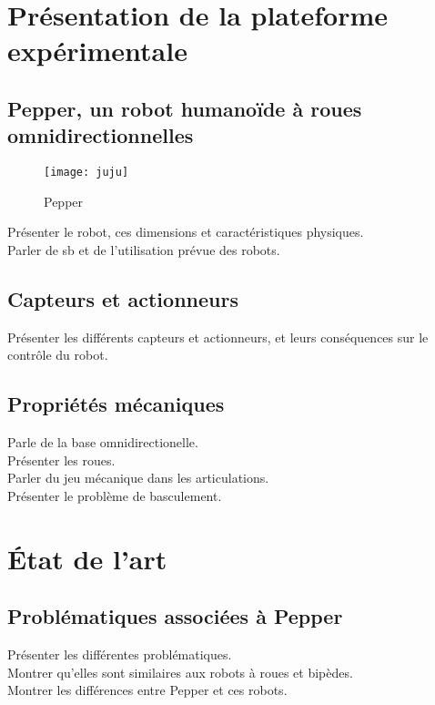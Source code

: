 \section{Présentation de la plateforme expérimentale}
\subsection{Pepper, un robot humanoïde à roues omnidirectionnelles}

\begin{figure}[!ht]	
	\begin{center}
		\texttt{[image: juju]}
		\caption{Pepper}
	\end{center} 
\end{figure}	

Présenter le robot, ces dimensions et caractéristiques physiques.\\
Parler de sb et de l'utilisation prévue des robots.

	
\subsection{Capteurs et actionneurs}

Présenter les différents capteurs et actionneurs, et leurs conséquences sur le contrôle du robot.

\subsection{Propriétés mécaniques}	

Parle de la base omnidirectionelle.\\
Présenter les roues.\\
Parler du jeu mécanique dans les articulations.\\
Présenter le problème de basculement.


\section{État de l'art}
\subsection{Problématiques associées à Pepper}

Présenter les différentes problématiques.\\
Montrer qu'elles sont similaires aux robots à roues et bipèdes.\\
Montrer les différences entre Pepper et ces robots.


